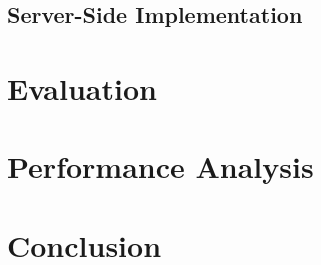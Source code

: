 \subsection{Server-Side Implementation}

\section{Evaluation}

\section{Performance Analysis}

\section{Conclusion}

